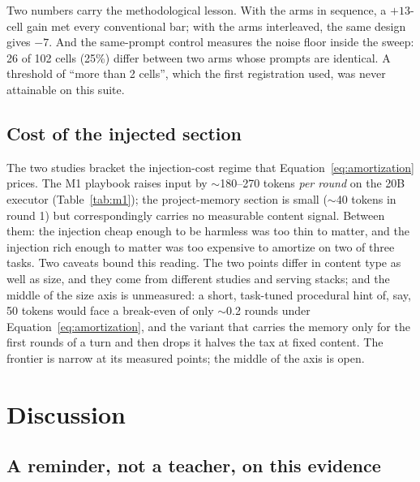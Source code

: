 \documentclass[smallcondensed,natbib]{svjour3}
\begin{document}
Two numbers carry the methodological lesson. With the arms in
sequence, a $+13$-cell gain met every conventional bar; with the arms
interleaved, the same design gives $-7$. And the same-prompt control
measures the noise floor inside the sweep: 26 of 102 cells (25\%)
differ between two arms whose prompts are identical. A threshold of
``more than 2 cells'', which the first registration used, was never
attainable on this suite.

\subsection{Cost of the injected section}\label{sec:results-cost}
The two studies bracket the injection-cost regime that
Equation~\eqref{eq:amortization} prices. The M1 playbook raises input by
$\sim$180--270 tokens \emph{per round} on the 20B executor
(Table~\ref{tab:m1}); the project-memory section is small
($\sim$40 tokens in round 1) but correspondingly carries no measurable
content signal. Between them: the injection cheap enough to be
harmless was too thin to matter, and the injection rich enough to
matter was too expensive to amortize on two of three tasks. Two caveats
bound this reading. The two points differ in content type as well as
size, and they come from different studies and serving stacks; and
the middle of the
size axis is unmeasured: a short, task-tuned procedural hint of,
say, 50 tokens would face a break-even of only $\sim$0.2 rounds under
Equation~\eqref{eq:amortization}, and the variant that carries the
memory only for the first rounds of a turn and then drops it halves
the tax at fixed content. The frontier is narrow at its measured
points; the middle of the axis is open.

\section{Discussion}\label{sec:discussion}

\subsection{A reminder, not a teacher, on this
evidence}\label{sec:disc-anticorr}
\end{document}

